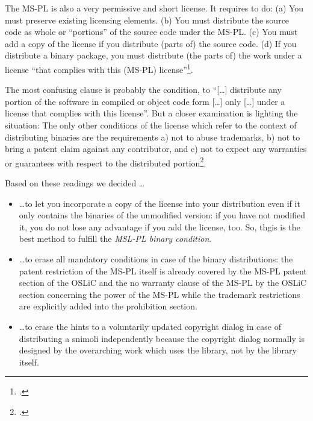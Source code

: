 The MS-PL is also a very permissive and short license. It requires to do:
(a) You must preserve existing licensing elements. (b) You must distribute
the source code as whole or \enquote{portions} of the source code under the
MS-PL. (c) You must add a copy of the license if you distribute (parts of) the
source code. (d) If you distribute a binary package, you must distribute (the
parts of) the work under a license \enquote{that complies with this (MS-PL)
license}\footcite[cf.][\nopage wp]{MsplOsiLicense2013a}.

The most confusing clause is probably the condition, to \enquote{[\ldots]
distribute any portion of the software in compiled or object code form [\ldots]
only [\ldots] under a license that complies with this license}. But a closer
examination is lighting the situation: The only other conditions of the license
which refer to the context of distributing binaries are the requirements a) not
to abuse trademarks, b) not to bring a patent claim against any contributor, and
c) not to expect any warranties or guarantees with respect to the distributed
portion\footcite[cf.][\nopage wp. §3A, §3B, §3E]{MsplOsiLicense2013a}.

Based on these readings we decided \ldots

\label{MsplSourceBinHint} 
\begin{itemize}
  \item \ldots to let you incorporate a copy of the license into your
  distribution even if it only contains the binaries of the unmodified version:
  if you have not modified it, you do not lose any advantage if you add the
  license, too. So, thgis is the best method to fulfill the \emph{MSL-PL binary
  condition}.
  \item \ldots to erase all mandatory conditions in case of the binary
  distributions: the patent restriction of the MS-PL itself is already covered
  by the MS-PL patent section of the OSLiC and the no warranty clause of the
  MS-PL by the OSLiC section concerning the power of the MS-PL while the
  trademark restrictions are explicitly added into the prohibition section.
  \item \ldots to erase the hints to a voluntarily updated copyright dialog in
  case of distributing a snimoli independently because the copyright dialog
  normally is designed by the overarching work which uses the library, not by
  the library itself.
\end{itemize}


%

